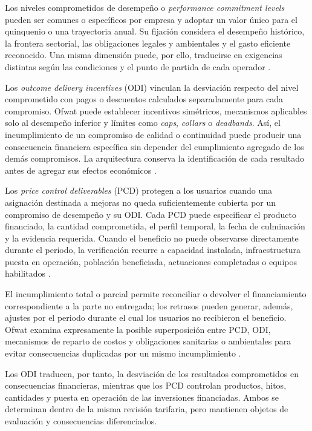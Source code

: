 Los niveles comprometidos de desempeño o \emph{performance commitment levels} pueden ser comunes o específicos por empresa y adoptar un valor único para el quinquenio o una trayectoria anual. Su fijación considera el desempeño histórico, la frontera sectorial, las obligaciones legales y ambientales y el gasto eficiente reconocido. Una misma dimensión puede, por ello, traducirse en exigencias distintas según las condiciones y el punto de partida de cada operador \citep{Ofwat2024Outcomes}.

Los \emph{outcome delivery incentives} (ODI) vinculan la desviación respecto del nivel comprometido con pagos o descuentos calculados separadamente para cada compromiso. Ofwat puede establecer incentivos simétricos, mecanismos aplicables solo al desempeño inferior y límites como \emph{caps}, \emph{collars} o \emph{deadbands}. Así, el incumplimiento de un compromiso de calidad o continuidad puede producir una consecuencia financiera específica sin depender del cumplimiento agregado de los demás compromisos. La arquitectura conserva la identificación de cada resultado antes de agregar sus efectos económicos \citep{Ofwat2024Outcomes}.

Los \emph{price control deliverables} (PCD) protegen a los usuarios cuando una asignación destinada a mejoras no queda suficientemente cubierta por un compromiso de desempeño y su ODI. Cada PCD puede especificar el producto financiado, la cantidad comprometida, el perfil temporal, la fecha de culminación y la evidencia requerida. Cuando el beneficio no puede observarse directamente durante el periodo, la verificación recurre a capacidad instalada, infraestructura puesta en operación, población beneficiada, actuaciones completadas o equipos habilitados \citep{Ofwat2023PCD,Ofwat2025PCD}.

El incumplimiento total o parcial permite reconciliar o devolver el financiamiento correspondiente a la parte no entregada; los retrasos pueden generar, además, ajustes por el periodo durante el cual los usuarios no recibieron el beneficio. Ofwat examina expresamente la posible superposición entre PCD, ODI, mecanismos de reparto de costos y obligaciones sanitarias o ambientales para evitar consecuencias duplicadas por un mismo incumplimiento \citep{Ofwat2023PCD,Ofwat2025PCD}.

Los ODI traducen, por tanto, la desviación de los resultados comprometidos en consecuencias financieras, mientras que los PCD controlan productos, hitos, cantidades y puesta en operación de las inversiones financiadas. Ambos se determinan dentro de la misma revisión tarifaria, pero mantienen objetos de evaluación y consecuencias diferenciados.

